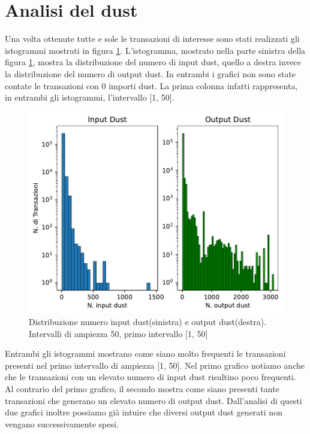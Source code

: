 \section{Analisi del dust}
Una volta ottenute tutte e sole le transazioni di interesse sono stati realizzati gli istogrammi mostrati in figura \ref{fig:dust_distribuzione}. L'istogramma, mostrato nella parte sinistra della figura \ref{fig:dust_distribuzione}, mostra la distribuzione del numero di input dust, quello a destra invece la distribuzione del numero di output dust. In entrambi i grafici non sono state contate le transazioni con 0 importi dust. La prima colonna infatti rappresenta, in entrambi gli istogrammi, l'intervallo [1, 50].
\begin{figure}[h!]
    \centering
    \includegraphics[scale=0.9]{Grafici/distribuzione_dust.pdf}
    \caption{Distribuzione numero input dust(sinistra) e output dust(destra). Intervalli di ampiezza 50, primo intervallo [1, 50]}
    \label{fig:dust_distribuzione}
\end{figure}
\FloatBarrier 
Entrambi gli istogrammi mostrano come siano molto frequenti le transazioni presenti nel primo intervallo di ampiezza [1, 50]. Nel primo grafico notiamo anche che le transazioni con un elevato numero di input dust risultino poco frequenti. Al contrario del primo grafico, il secondo mostra come siano presenti tante transazioni che generano un elevato numero di output dust. Dall'analisi di questi due grafici inoltre possiamo già intuire che diversi output dust generati non vengano successivamente spesi.

